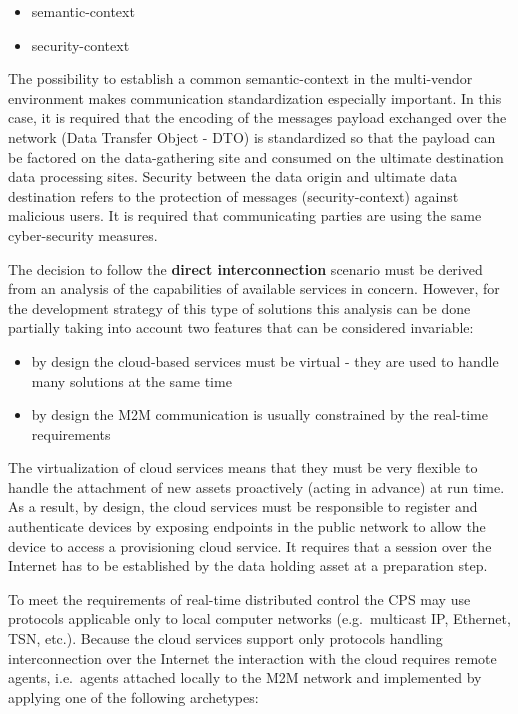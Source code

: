 \documentclass{jacsart}
\begin{document}
\begin{itemize}
      \item semantic-context
      \item security-context
\end{itemize}

The possibility to establish a common semantic-context in the multi-vendor environment makes communication standardization especially important. In this case, it is required that the encoding of the messages payload exchanged over the network (Data Transfer Object - DTO) is standardized so that the payload can be factored on the data-gathering site and consumed on the ultimate destination data processing sites. Security between the data origin and ultimate data destination refers to the protection of messages (security-context) against malicious users. It is required that communicating parties are using the same cyber-security measures.

The decision to follow the \textbf{direct interconnection} scenario must be derived from an analysis of the capabilities of available services in concern. However, for the development strategy of this type of solutions this analysis can be done partially taking into account two features that can be considered invariable:

\begin{itemize}
      \item by design the cloud-based services must be virtual - they are used to handle many solutions at the same time
      \item by design the M2M communication is usually constrained by the real-time requirements
\end{itemize}

The virtualization of cloud services means that they must be very flexible to handle the attachment of new assets proactively (acting in advance) at run time. As a result, by design, the cloud services must be responsible to register and authenticate devices by exposing endpoints in the public network to allow the device to access a provisioning cloud service. It requires that a session over the Internet has to be established by the data holding asset at a preparation step.

To meet the requirements of real-time distributed control the CPS may use protocols applicable only to local computer networks (e.g.~multicast IP, Ethernet, TSN, etc.). Because the cloud services support only protocols handling interconnection over the Internet the interaction with the cloud requires remote agents, i.e.~agents attached locally to the M2M network and implemented by applying one of the following archetypes:
\end{document}

